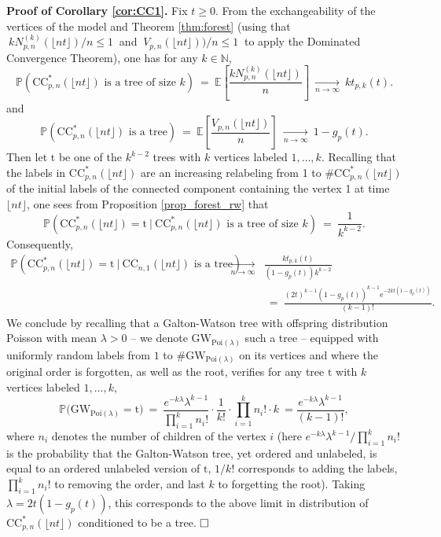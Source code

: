 \documentclass[a4, 11pt]{article}
\numberwithin{equation}{section}
\theoremstyle{plain}
\theoremstyle{definition}
\theoremstyle{remark}
\begin{document}
\textbf{Proof of Corollary \ref{cor:CC1}.} Fix $t \geq 0$.
From the exchangeability of the vertices of the model and Theorem \ref{thm:forest} (using that $~kN_{p,n}^{(k)}(\lfloor nt \rfloor)/n \leq 1~$ and $~V_{p,n}(\lfloor nt \rfloor))/n \leq 1~$ to apply the Dominated Convergence Theorem), one has for any $k\in \mathbb N$,
$$
\mathbb P\left(\mathrm{CC}^*_{p,n}(\lfloor nt \rfloor) \text{ is a tree of size } k\right)~=~\mathbb E\left[\frac{kN_{p,n}^{(k)}(\lfloor nt \rfloor)}{n}\right] ~\underset{n \rightarrow \infty} \longrightarrow ~ kt_{p,k}(t).
$$
and 
$$
\mathbb P\left(\mathrm{CC}^*_{p,n}(\lfloor nt \rfloor) \text{ is a tree}\right)~=~\mathbb E\left[\frac{V_{p,n}(\lfloor nt \rfloor)}{n}\right]~\underset{n \rightarrow \infty} \longrightarrow ~ 1-g_p(t).
$$
Then let $\mathrm t$ be one of the $k^{k-2}$ trees with $k$ vertices labeled $1,\ldots,k$. Recalling that the labels in $\mathrm{CC}^*_{p,n}(\lfloor nt \rfloor)$ are an increasing relabeling from 1 to $\# \mathrm{CC}^*_{p,n}(\lfloor nt \rfloor)$ of the initial labels of the connected component containing the vertex 1 at time $\lfloor nt \rfloor$, one sees from Proposition \ref{prop_forest_rw} that
$$
\mathbb P\left(\mathrm{CC}^*_{p,n}(\lfloor nt \rfloor)=\mathrm t ~ | ~\text{$\mathrm{CC}^*_{p,n}(\lfloor nt \rfloor)$ is a tree of size $k$} \right)~=~ \frac{1}{k^{k-2}}.
$$ 
Consequently,
\begin{eqnarray*}
\mathbb P\left(\mathrm{CC}^*_{p,n}(\lfloor nt \rfloor)=\mathrm t  ~ | ~\text{$\mathrm{CC}_{n,1}(\lfloor nt \rfloor)$ is a tree} \right)& \underset{n \rightarrow \infty} \longrightarrow& \frac{kt_{p,k}(t)}{(1-g_p(t)) k^{k-2}} \\
&& ~=~ \frac{\left(2t\right)^{k-1}\left(1-g_p(t)\right)^{k-1} \mathrm{e}^{-2kt\left(1-g_p(t)\right)}}{(k-1)!}.
\end{eqnarray*}
We conclude by recalling that a Galton-Watson tree with offspring distribution Poisson with mean $\lambda>0$ -- we denote $\mathrm{GW}_{\mathrm {Poi}(\lambda)}$ such a tree -- equipped with uniformly random labels from $1$ to $\#\mathrm{GW}_{\mathrm {Poi}(\lambda)}$ on its vertices and where the original order is forgotten, as well as the root, verifies for any tree $\mathrm t$ with $k$ vertices labeled $1,\ldots,k$,
$$
\mathbb P\big(\mathrm{GW}_{\mathrm {Poi}(\lambda)}= \mathrm t \big)~=~\frac{e^{-k\lambda } \lambda^{k-1}}{\prod_{i=1}^k n_i!} \cdot \frac{1}{k!} \cdot \prod_{i=1}^k n_i! \cdot k~= \frac{e^{-k\lambda } \lambda^{k-1}}{(k-1)!},
$$
where $n_i$ denotes the number of children of the vertex  $i$ (here $e^{-k\lambda } \lambda^{k-1}/\prod_{i=1}^k n_i!$ is the probability that the Galton-Watson tree, yet ordered and unlabeled, is equal to an ordered unlabeled version of $\mathrm t$, $1/k!$ corresponds to adding the labels,  $\prod_{i=1}^k n_i!$ to removing the order, and last $k$ to forgetting the root). Taking $\lambda=2t(1-g_p(t))$, this corresponds to the above limit in distribution of $\mathrm{CC}^*_{p,n}(\lfloor nt \rfloor)$ conditioned to be a tree. $\hfill \square$
\end{document}
